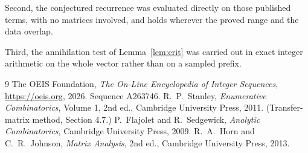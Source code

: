 \documentclass[11pt,a4paper]{article}
\theoremstyle{plain}
\theoremstyle{definition}
\begin{document}
Second, the conjectured recurrence was evaluated directly on those published terms, with no
matrices involved, and holds wherever the proved range and the data overlap.

Third, the annihilation test of Lemma~\ref{lem:crit} was carried out in exact integer
arithmetic on the whole vector rather than on a sampled prefix.

\begin{thebibliography}{9}
 The OEIS Foundation, \emph{The On-Line Encyclopedia of Integer
Sequences}, \url{https://oeis.org}, 2026. Sequence A263746.
 R.~P.~Stanley, \emph{Enumerative Combinatorics}, Volume 1, 2nd ed.,
Cambridge University Press, 2011. (Transfer-matrix method, Section 4.7.)
 P.~Flajolet and R.~Sedgewick, \emph{Analytic Combinatorics}, Cambridge
University Press, 2009.
 R.~A.~Horn and C.~R.~Johnson, \emph{Matrix Analysis}, 2nd ed., Cambridge
University Press, 2013.
\end{thebibliography}
\end{document}
